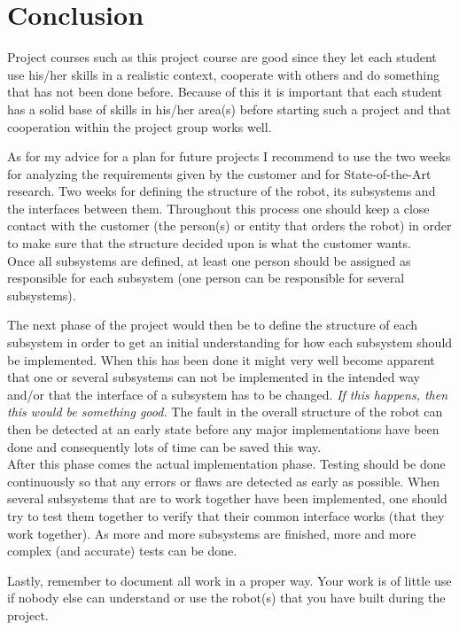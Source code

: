 \section{Conclusion}\label{sec:conclusion}
Project courses such as this project course are good since they let each student use his/her skills in a realistic context, cooperate with others and do something that has not been done before. Because of this it is important that each student has a solid base of skills in his/her area(s) before starting such a project and that cooperation within the project group works well.

As for my advice for a plan for future projects I recommend to use the two weeks for analyzing the requirements given by the customer and for State-of-the-Art research. Two weeks for defining the structure of the robot, its subsystems and the interfaces between them. Throughout this process one should keep a close contact with the customer (the person(s) or entity that orders the robot) in order to make sure that the structure decided upon is what the customer wants. \\
Once all subsystems are defined, at least one person should be assigned as responsible for each subsystem (one person can be responsible for several subsystems).

The next phase of the project would then be to define the structure of each subsystem in order to get an initial understanding for how each subsystem should be implemented. When this has been done it might very well become apparent that one or several subsystems can not be implemented in the intended way and/or that the interface of a subsystem has to be changed.\emph{ If this happens, then this would be something good.} The fault in the overall structure of the robot can then be detected at an early state before any major implementations have been done and consequently lots of time can be saved this way. \\
After this phase comes the actual implementation phase. Testing should be done continuously so that any errors or flaws are detected as early as possible. When several subsystems that are to work together have been implemented, one should try to test them together to verify that their common interface works (that they work together). As more and more subsystems are finished, more and more complex (and accurate) tests can be done.

Lastly, remember to document all work in a proper way. Your work is of little use if nobody else can understand or use the robot(s) that you have built during the project.